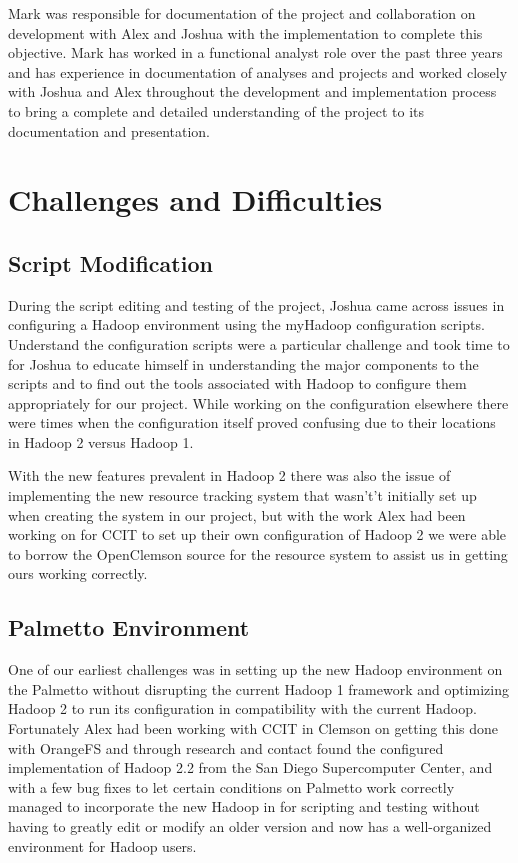 \documentclass[conference]{IEEEtran}
\begin{document}
			Mark was responsible for documentation of the project and collaboration on development with Alex and Joshua with the implementation to complete this objective. Mark has worked in a functional analyst role over the past three years and has experience in documentation of analyses and projects and worked closely with Joshua and Alex throughout the development and implementation process to bring a complete and detailed understanding of the project to its documentation and presentation.

		\section{Challenges and Difficulties}
			\subsection{Script Modification}
				During the script editing and testing of the project, Joshua came across issues in configuring a Hadoop environment using the myHadoop configuration scripts. Understand the configuration scripts were a particular challenge and took time to for Joshua to educate himself in understanding the major components to the scripts and to find out the tools associated with Hadoop to configure them appropriately for our project. While working on the configuration elsewhere there were times when the configuration itself proved confusing due to their locations in Hadoop 2 versus Hadoop 1. 

                With the new features prevalent in Hadoop 2 there was also the issue of implementing the new resource tracking system that wasn't’t initially set up when creating the system in our project, but with the work Alex had been working on for CCIT to set up their own configuration of Hadoop 2 we were able to borrow the OpenClemson source\cite{openclemson} for the resource system to assist us in getting ours working correctly.
			\subsection{Palmetto Environment}
				One of our earliest challenges was in setting up the new Hadoop environment on the Palmetto without disrupting the current Hadoop 1 framework and optimizing Hadoop 2 to run its configuration in compatibility with the current Hadoop. Fortunately Alex had been working with CCIT in Clemson on getting this done with OrangeFS and through research and contact found the configured implementation of Hadoop 2.2 from the San Diego Supercomputer Center, and with a few bug fixes to let certain conditions on Palmetto work correctly managed to incorporate the new Hadoop in for scripting and testing without having to greatly edit or modify an older version and now has a well-organized environment for Hadoop users.
\end{document}
